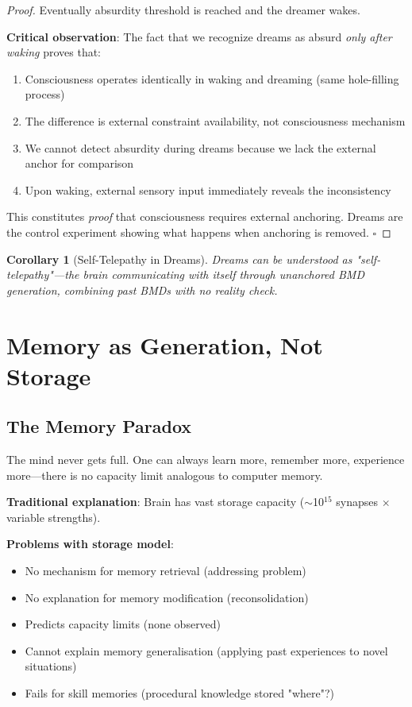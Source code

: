 \documentclass[11pt,a4paper]{article}
\newtheorem{corollary}[theorem]{Corollary}
\begin{document}
\begin{proof}
Eventually absurdity threshold is reached and the dreamer wakes.

\textbf{Critical observation}: The fact that we recognize dreams as absurd \textit{only after waking} proves that:
\begin{enumerate}
\item Consciousness operates identically in waking and dreaming (same hole-filling process)
\item The difference is external constraint availability, not consciousness mechanism
\item We cannot detect absurdity during dreams because we lack the external anchor for comparison
\item Upon waking, external sensory input immediately reveals the inconsistency
\end{enumerate}

This constitutes \textit{proof} that consciousness requires external anchoring. Dreams are the control experiment showing what happens when anchoring is removed. $\square$
\end{proof}

\begin{corollary}[Self-Telepathy in Dreams]
Dreams can be understood as "self-telepathy"—the brain communicating with itself through unanchored BMD generation, combining past BMDs with no reality check.
\end{corollary}

\section{Memory as Generation, Not Storage}

\subsection{The Memory Paradox}

\begin{observation}
The mind never gets full. One can always learn more, remember more, experience more—there is no capacity limit analogous to computer memory.
\end{observation}

\textbf{Traditional explanation}: Brain has vast storage capacity ($\sim$10$^{15}$ synapses $\times$ variable strengths).

\textbf{Problems with storage model}:
\begin{itemize}
\item No mechanism for memory retrieval (addressing problem)
\item No explanation for memory modification (reconsolidation)
\item Predicts capacity limits (none observed)
\item Cannot explain memory generalisation (applying past experiences to novel situations)
\item Fails for skill memories (procedural knowledge stored "where"?)
\end{itemize}
\end{document}
